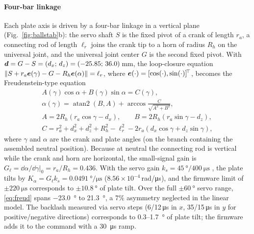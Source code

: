 \paragraph{Four-bar linkage}
Each plate axis is driven by a four-bar linkage in a vertical plane (Fig.~\ref{fig:ballstab}b): the servo shaft $S$ is the fixed pivot of a crank of length $r_a$, a connecting rod of length $\ell_r$ joins the crank tip to a horn of radius $R_h$ on the universal joint, and the universal joint center $G$ is the second fixed pivot. With $\bm{d}=G-S=(d_x;\,d_z)=(-25.85;\,36.0)$\,mm, the loop-closure equation $\|S+r_a\bm{e}(\gamma)-G-R_h\bm{e}(\alpha)\|=\ell_r$, where $\bm{e}(\cdot)=[\cos(\cdot),\sin(\cdot)]^{\!\top}$, becomes the Freudenstein-type equation \cite{freudenstein1955}
\begin{gather}
  A(\gamma)\cos\alpha+B(\gamma)\sin\alpha=C(\gamma), \nonumber\\
  \alpha(\gamma)=\operatorname{atan2}(B,A)+\arccos\frac{C}{\sqrt{A^2+B^2}}, \label{eq:freud}\\
  A=2R_h(r_a\cos\gamma-d_x),\qquad B=2R_h(r_a\sin\gamma-d_z), \nonumber\\
  C=r_a^2+d_x^2+d_z^2+R_h^2-\ell_r^2-2r_a(d_x\cos\gamma+d_z\sin\gamma), \nonumber
\end{gather}
where $\gamma$ and $\alpha$ are the crank and plate angles (on the branch containing the assembled neutral position). Because at neutral the connecting rod is vertical while the crank and horn are horizontal, the small-signal gain is $G_\ell=\dd\alpha/\dd\gamma|_0=r_a/R_h=0.436$. With the servo gain $k_s=\SI{45}{\degree}/\SI{400}{\micro\second}$ \cite{futaba_s3003}, the plate tilts by $K_\alpha=G_\ell k_s=\SI{0.0491}{\degree\per\micro\second}$ ($8.56\times10^{-4}$\,rad/\si{\micro\second}), and the firmware limit of $\pm\SI{220}{\micro\second}$ corresponds to $\pm\SI{10.8}{\degree}$ of plate tilt. Over the full $\pm\SI{60}{\degree}$ servo range, \eqref{eq:freud} spans \SI{-23.0}{\degree} to \SI{21.3}{\degree}, a 7\% asymmetry neglected in the linear model. The backlash measured via servo steps (6/12\,\si{\micro\second} in $x$, 35/15\,\si{\micro\second} in $y$ for positive/negative directions) corresponds to 0.3--\SI{1.7}{\degree} of plate tilt; the firmware adds it to the command with a \SI{30}{\micro\second} ramp.

